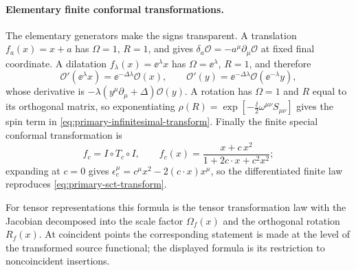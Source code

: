 \paragraph{Elementary finite conformal transformations.}
The elementary generators make the signs transparent.  A translation
\(f_a(x)=x+a\) has \(\Omega=1\), \(R=1\), and gives
\(\delta_a\mathcal O=-a^\mu\partial_\mu\mathcal O\) at fixed final coordinate.
A dilatation \(f_\lambda(x)=\ee^\lambda x\) has
\(\Omega=\ee^\lambda\), \(R=1\), and therefore
\[
  \mathcal O'(\ee^\lambda x)=\ee^{-\Delta\lambda}\mathcal O(x),
  \qquad
  \mathcal O'(y)=\ee^{-\Delta\lambda}\mathcal O(\ee^{-\lambda}y),
\]
whose derivative is
\(-\lambda(y^\mu\partial_\mu+\Delta)\mathcal O(y)\).  A rotation has
\(\Omega=1\) and \(R\) equal to its orthogonal matrix, so exponentiating
\(\rho(R)=\exp[-\frac{\ii}{2}\omega^{\mu\nu}S_{\mu\nu}]\) gives the spin term
in \eqref{eq:primary-infinitesimal-transform}.  Finally the finite special
conformal transformation is
\[
  f_c=I\circ T_c\circ I,
  \qquad
  f_c(x)=\frac{x+c\,x^2}{1+2c\cdot x+c^2x^2};
\]
expanding at \(c=0\) gives
\(\epsilon_c^\mu=c^\mu x^2-2(c\cdot x)x^\mu\), so the differentiated finite law
reproduces \eqref{eq:primary-sct-transform}.

\begin{remark}
For tensor representations this formula is the tensor transformation law with
the Jacobian decomposed into the scale factor \(\Omega_f(x)\) and the
orthogonal rotation \(R_f(x)\).  At coincident points the corresponding
statement is made at the level of the transformed source functional; the
displayed formula is its restriction to noncoincident insertions.
\end{remark}

